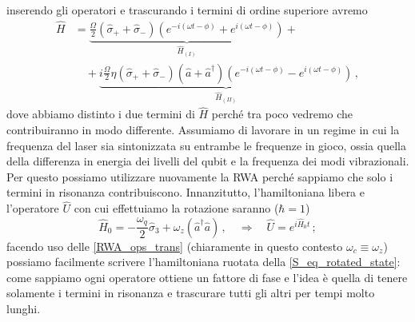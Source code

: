 inserendo gli operatori e trascurando i termini di ordine superiore avremo
\begin{equation}\label{hams_I_II}
    \begin{aligned}
        \hat{H} &= \underbrace{\frac{\Omega}{2} (\hat{\sigma}_+ + \hat{\sigma}_-) \left( e^{-i(\omega t - \phi)} + e^{i(\omega t - \phi)}  \right)}_{\hat{H}_{(I)}} + \\
        &\quad + \underbrace{i \frac{\Omega}{2} \eta (\hat{\sigma}_+ + \hat{\sigma}_-) (\hat{a} + \hat{a}^\dag) \left( e^{-i(\omega t - \phi)} - e^{i(\omega t - \phi)}  \right)}_{\hat{H}_{(II)}} \, ,
    \end{aligned}
\end{equation}
dove abbiamo distinto i due termini di $\hat{H}$ perché tra poco vedremo che contribuiranno in modo differente. Assumiamo di lavorare in un regime in cui la frequenza del laser sia sintonizzata su entrambe le frequenze in gioco, ossia quella della differenza in energia dei livelli del qubit e la frequenza dei modi vibrazionali. Per questo possiamo utilizzare nuovamente la RWA perché sappiamo che solo i termini in risonanza contribuiscono. Innanzitutto, l'hamiltoniana libera e l'operatore $\hat{U}$ con cui effettuiamo la rotazione saranno ($\hbar = 1$)
\begin{equation*}
    \hat{H}_0 = -\frac{\omega_q}{2} \hat{\sigma}_3 + \omega_z (\hat{a}^\dag \hat{a}) \, , \quad \Rightarrow \quad \hat{U} = e^{i \hat{H}_0 t} \, ;
\end{equation*}
facendo uso delle \eqref{RWA_ops_trans} (chiaramente in questo contesto $\omega_c \equiv \omega_z$) possiamo facilmente scrivere l'hamiltoniana ruotata della \eqref{S_eq_rotated_state}: come sappiamo ogni operatore ottiene un fattore di fase e l'idea è quella di tenere solamente i termini in risonanza e trascurare tutti gli altri per tempi molto lunghi. 

